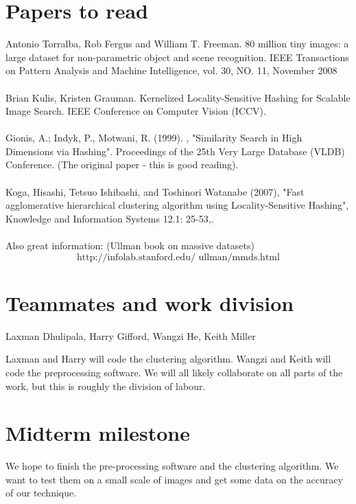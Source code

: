 \documentclass[11pt]{article}
\begin{document}
\section*{Papers to read}
Antonio Torralba, Rob Fergus and William T. Freeman.	 80 million tiny images: a large dataset for 
non-parametric object and scene recognition. IEEE Transactions on Pattern Analysis and Machine 
Intelligence, vol. 30, NO. 11, November 2008\\
\\
Brian Kulis, Kristen Grauman. Kernelized Locality-Sensitive Hashing for Scalable Image Search. IEEE Conference on 
Computer Vision (ICCV). \\
\\
Gionis, A.; Indyk, P., Motwani, R. (1999). , "Similarity Search in High Dimensions via Hashing". Proceedings 
of the 25th Very Large Database (VLDB) Conference. (The original paper - this is good reading). \\
\\
Koga, Hisashi, Tetsuo Ishibashi, and Toshinori Watanabe (2007), "Fast agglomerative hierarchical 
clustering algorithm using Locality-Sensitive Hashing", Knowledge and Information Systems 12.1: 25-53,.\\
\\
Also great information: (Ullman book on massive datasets) 
\[
\text{http://infolab.stanford.edu/~ullman/mmds.html}
\]


\section*{Teammates and work division}
Laxman Dhulipala, Harry Gifford, Wangzi He, Keith Miller

Laxman and Harry will code the clustering algorithm. Wangzi and Keith will code the preprocessing 
software. We will all likely collaborate on all parts of the work, but this is roughly the division of labour. 

\section*{Midterm milestone}
We hope to finish the pre-processing software and the clustering algorithm. We want to test them on a small 
scale of images and get some data on the accuracy of our technique.  
\end{document}

